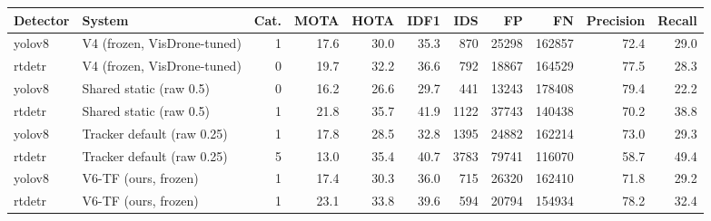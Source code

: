 \begin{tabular}{llrrrrrrrrr}
\toprule
Detector & System & Cat. & MOTA & HOTA & IDF1 & IDS & FP & FN & Precision & Recall \\
\midrule
yolov8 & V4 (frozen, VisDrone-tuned) & 1 & 17.6 & 30.0 & 35.3 & 870 & 25298 & 162857 & 72.4 & 29.0 \\
rtdetr & V4 (frozen, VisDrone-tuned) & 0 & 19.7 & 32.2 & 36.6 & 792 & 18867 & 164529 & 77.5 & 28.3 \\
yolov8 & Shared static (raw 0.5) & 0 & 16.2 & 26.6 & 29.7 & 441 & 13243 & 178408 & 79.4 & 22.2 \\
rtdetr & Shared static (raw 0.5) & 1 & 21.8 & 35.7 & 41.9 & 1122 & 37743 & 140438 & 70.2 & 38.8 \\
yolov8 & Tracker default (raw 0.25) & 1 & 17.8 & 28.5 & 32.8 & 1395 & 24882 & 162214 & 73.0 & 29.3 \\
rtdetr & Tracker default (raw 0.25) & 5 & 13.0 & 35.4 & 40.7 & 3783 & 79741 & 116070 & 58.7 & 49.4 \\
yolov8 & V6-TF (ours, frozen) & 1 & 17.4 & 30.3 & 36.0 & 715 & 26320 & 162410 & 71.8 & 29.2 \\
rtdetr & V6-TF (ours, frozen) & 1 & 23.1 & 33.8 & 39.6 & 594 & 20794 & 154934 & 78.2 & 32.4 \\
\bottomrule
\end{tabular}
